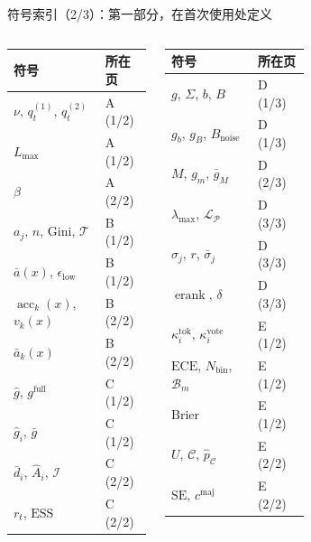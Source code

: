 \documentclass[aspectratio=169,11pt]{beamer}
\newcommand{\acc}{\operatorname{acc}}
\begin{document}
\begin{frame}{符号索引（2/3）：第一部分，在首次使用处定义}
\scriptsize
\setlength{\tabcolsep}{3pt}\renewcommand{\arraystretch}{1.15}
\begin{columns}[T]
\begin{tabular}{@{}ll@{}}
\toprule
\textbf{符号} & \textbf{所在页}\\ \midrule
$\nu$, $q^{(1)}_t$, $q^{(2)}_t$ & A (1/2)\\
$L_{\max}$ & A (1/2)\\
$\beta$ & A (2/2)\\
$a_j$, $n$, $\mathrm{Gini}$, $\mathcal T$ & B (1/2)\\
$\bar a(x)$, $\epsilon_{\mathrm{low}}$ & B (1/2)\\
$\acc_k(x)$, $v_k(x)$ & B (2/2)\\
$\bar a_k(x)$ & B (2/2)\\
$\hat g$, $g^{\mathrm{full}}$ & C (1/2)\\
$\hat g_i$, $\bar g$ & C (1/2)\\
$\bar d_i$, $\hat A_i$, $\mathcal I$ & C (2/2)\\
$r_t$, $\mathrm{ESS}$ & C (2/2)\\
\bottomrule
\end{tabular}
\begin{tabular}{@{}ll@{}}
\toprule
\textbf{符号} & \textbf{所在页}\\ \midrule
$g$, $\Sigma$, $b$, $B$ & D (1/3)\\
$g_b$, $g_B$, $B_{\mathrm{noise}}$ & D (1/3)\\
$M$, $g_m$, $\bar g_M$ & D (2/3)\\
$\lambda_{\max}$, $\mathcal L_{\mathcal P}$ & D (3/3)\\
$\sigma_j$, $r$, $\bar\sigma_j$ & D (3/3)\\
$\operatorname{erank}$, $\delta$ & D (3/3)\\
$\kappa^{\mathrm{tok}}_i$, $\kappa^{\mathrm{vote}}_i$ & E (1/2)\\
$\mathrm{ECE}$, $N_{\mathrm{bin}}$, $\mathcal B_m$ & E (1/2)\\
$\mathrm{Brier}$ & E (1/2)\\
$U$, $\mathcal C$, $\hat p_{\mathcal C}$ & E (2/2)\\
$\mathrm{SE}$, $c^{\mathrm{maj}}$ & E (2/2)\\
\bottomrule
\end{tabular}
\begin{tabular}{@{}ll@{}}

\end{tabular}
\end{columns}
\end{frame}
\end{document}
